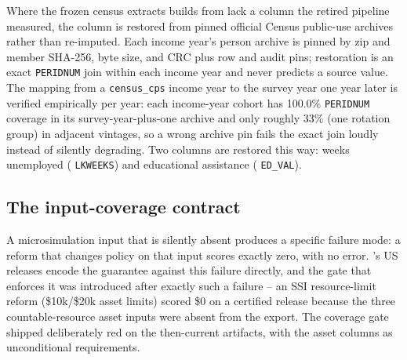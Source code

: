Where the frozen census extracts \microcosm{} builds from lack a column the
retired pipeline measured, the column is restored from pinned official
Census \asec{} public-use archives rather than re-imputed. Each income
year's person archive is pinned by zip and member SHA-256, byte size, and
CRC plus row and audit pins; restoration is an exact \texttt{PERIDNUM}
join within each income year and never predicts a source value. The
mapping from a \texttt{census\_cps} income year to the \asec{} survey year
one year later is verified empirically per year: each income-year cohort
has 100.0\% \texttt{PERIDNUM} coverage in its survey-year-plus-one archive
and only roughly 33\% (one rotation group) in adjacent vintages, so a
wrong archive pin fails the exact join loudly instead of silently
degrading. Two columns are restored this way: weeks unemployed (\asec{}
\texttt{LKWEEKS}) and educational assistance (\asec{} \texttt{ED\_VAL}).

\subsection{The input-coverage contract}
\label{sec:input-coverage}

A microsimulation input that is silently absent produces a specific
failure mode: a reform that changes policy on that input scores exactly
zero, with no error. \microcosm{}'s US releases encode the guarantee
against this failure directly, and the gate that enforces it was
introduced after exactly such a failure -- an SSI resource-limit reform
(\$10k/\$20k asset limits) scored \$0 on a certified release because the
three countable-resource asset inputs were absent from the export. The
coverage gate shipped deliberately red on the then-current artifacts, with
the asset columns as unconditional requirements.

